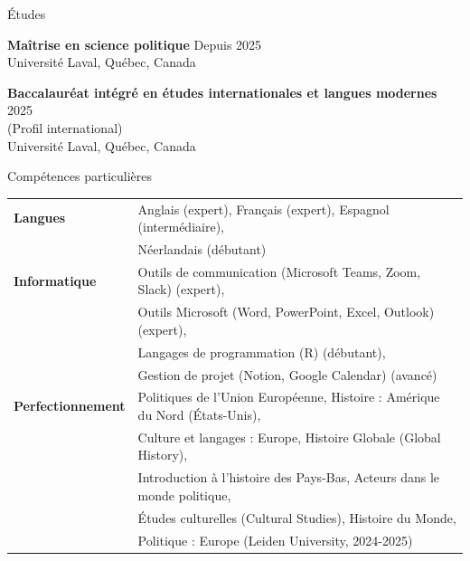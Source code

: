 \documentclass{resume} %
\begin{document}
  


\begin{rSection}{Études}

{\bf Maîtrise en science politique} \hfill {Depuis 2025}
\\ 
Université Laval, Québec, Canada

{\bf Baccalauréat intégré en études internationales et langues modernes} \hfill {2025}
\\ 
(Profil international)
\\
Université Laval, Québec, Canada

\end{rSection} 


\begin{rSection}{Compétences particulières}

\begin{tabular}{ @{} >{\bfseries}l @{\hspace{6ex}} l }  
Langues & Anglais (expert), Français (expert), Espagnol (intermédiaire), \\& Néerlandais (débutant)\\
Informatique & Outils de communication (Microsoft Teams, Zoom, Slack) (expert), \\& Outils Microsoft (Word, PowerPoint, Excel, Outlook) (expert), \\& Langages de programmation (R) (débutant), \\& Gestion de projet (Notion, Google Calendar) (avancé)\\
Perfectionnement & Politiques de l'Union Européenne, Histoire : Amérique du Nord (États-Unis), \\& Culture et langages : Europe, Histoire Globale (Global History), \\& Introduction à l'histoire des Pays-Bas, Acteurs dans le monde politique, \\& Études culturelles (Cultural Studies), Histoire du Monde, \\& Politique : Europe (Leiden University, 2024-2025)\\      
 
\end{tabular}   

\end{rSection}
\end{document}
